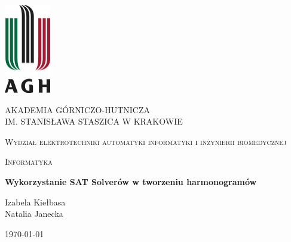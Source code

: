 \documentclass{article}
\begin{document}
\begin{titlepage}
	\centering
	\includegraphics[width=0.15\textwidth]{agh}\par\vspace{1cm}	
	{\scshape\large AKADEMIA GÓRNICZO-HUTNICZA \\IM. STANISŁAWA STASZICA W KRAKOWIE \par}
	\vspace{0.5cm}
	{\scshape\large Wydział elektrotechniki automatyki	informatyki i inżynierii biomedycznej \par}
	\vspace{0.5cm}
	{\scshape\Large Informatyka \par}
	\vspace{1cm}
	{\huge\bfseries Wykorzystanie SAT Solverów w tworzeniu harmonogramów\par}
	\vspace{2cm}
	{\large Izabela Kiełbasa \\ Natalia Janecka\par}
	\vfill
	\vfill
	{\large \today\par}
\end{titlepage}
\clearpage
\end{document}
